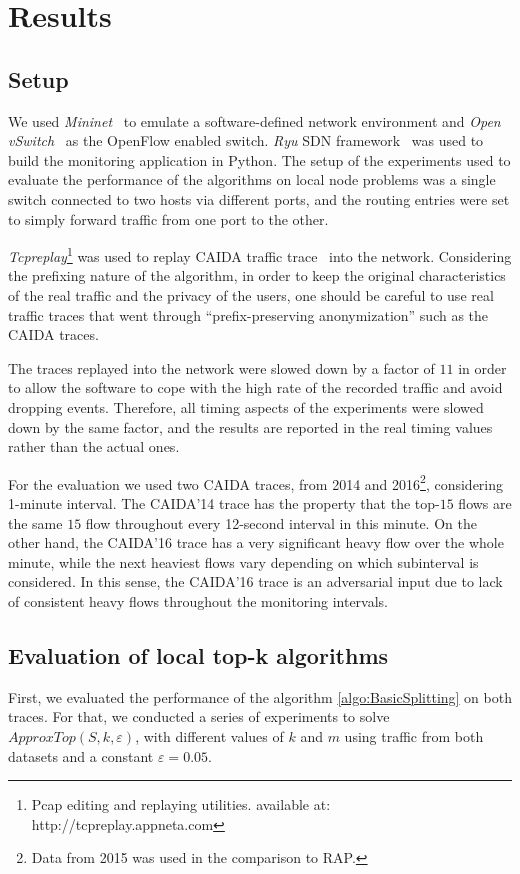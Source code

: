 \section{Results}
\subsection{Setup}
We used \textit{Mininet}~\cite{conf/hotnets/LantzHM10, Mininet} to emulate a software-defined network environment and \textit{Open vSwitch}~\cite{Pfaff2009, OVS} as the OpenFlow enabled switch. \textit{Ryu} SDN framework~\cite{Ryu} was used to build the monitoring application in Python. The setup of the experiments used to evaluate the performance of the algorithms on local node problems was a single switch connected to two hosts via different ports, and the routing entries were set to simply forward traffic from one port to the other.

\textit{Tcpreplay}\footnote{Pcap editing and replaying utilities. available at: http://tcpreplay.appneta.com} was used to replay CAIDA traffic trace~\cite{CAIDA14, CAIDA16} into the network. Considering the prefixing nature of the algorithm, in order to keep the original characteristics of the real traffic and the privacy of the users, one should be careful to use real traffic traces that went through ``prefix-preserving anonymization'' such as the CAIDA traces.

The traces replayed into the network were slowed down by a factor of $11$ in order to allow the software to cope with the high rate of the recorded traffic and avoid dropping events. Therefore, all timing aspects of the experiments were slowed down by the same factor, and the results are reported in the real timing values rather than the actual ones.

For the evaluation we used two CAIDA traces, from 2014 and 2016\footnote{Data from 2015 was used in the comparison to RAP.}, considering 1-minute interval. The CAIDA'14 trace has the property that the top-$15$ flows are the same $15$ flow throughout every 12-second interval in this minute.
On the other hand, the CAIDA'16 trace has a very significant heavy flow over the whole minute, while the next heaviest flows vary depending on which subinterval is considered. In this sense, the CAIDA'16 trace is an adversarial input due to lack of consistent heavy flows throughout the monitoring intervals.

\subsection{Evaluation of local top-k algorithms}
First, we evaluated the performance of the algorithm \ref{algo:BasicSplitting} on both traces. For that, we conducted a series of experiments to solve $ApproxTop(S,k,\varepsilon)$, with different values of $k$ and $m$ using traffic from both datasets and a constant $\varepsilon=0.05$.

